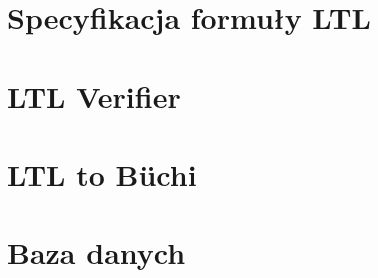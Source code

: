 \section{Specyfikacja formuły LTL} \label{sec:LTL_formula_spec}



\section{LTL Verifier}



\section{LTL to Büchi}



\section{Baza danych}

